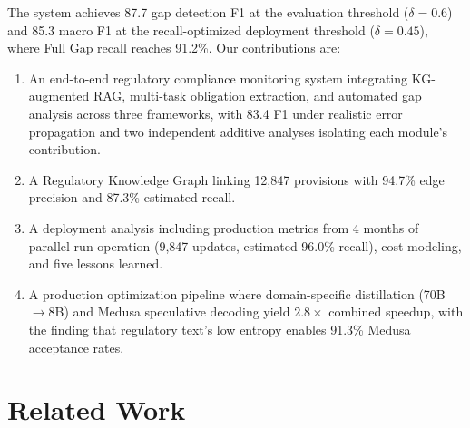 \documentclass[11pt]{article}
\begin{document}
The system achieves 87.7 gap detection F1 at the evaluation threshold ($\delta{=}0.6$) and 85.3 macro F1 at the recall-optimized deployment threshold ($\delta{=}0.45$), where Full Gap recall reaches 91.2\%. Our contributions are:
\begin{enumerate}
    \itemsep0em
    \item An end-to-end regulatory compliance monitoring system integrating KG-augmented RAG, multi-task obligation extraction, and automated gap analysis across three frameworks, with 83.4 F1 under realistic error propagation and two independent additive analyses isolating each module's contribution.
    \item A Regulatory Knowledge Graph linking 12{,}847 provisions with 94.7\% edge precision and 87.3\% estimated recall.
    \item A deployment analysis including production metrics from 4 months of parallel-run operation (9{,}847 updates, estimated 96.0\% recall), cost modeling, and five lessons learned.
    \item A production optimization pipeline where domain-specific distillation (70B$\to$8B) and Medusa speculative decoding yield $2.8\times$ combined speedup, with the finding that regulatory text's low entropy enables 91.3\% Medusa acceptance rates.
\end{enumerate}


\section{Related Work}
\label{sec:related}
\end{document}
